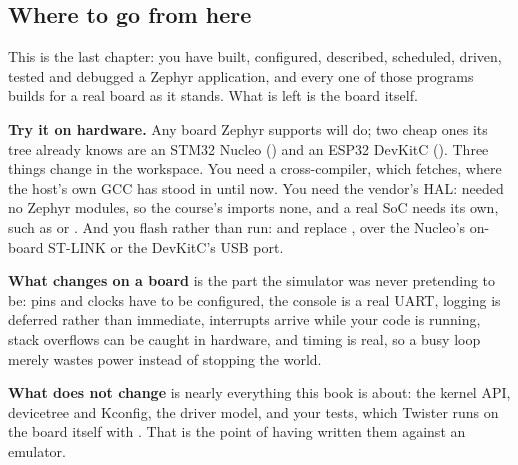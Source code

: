 \subsection*{Where to go from here}
This is the last chapter: you have built, configured, described, scheduled, driven, tested and
debugged a Zephyr application, and every one of those programs builds for a real board as it stands.
What is left is the board itself.

\textbf{Try it on hardware.} Any board Zephyr supports will do; two cheap ones its tree already
knows are an STM32 Nucleo () and an ESP32 DevKitC
(). Three things change in the workspace. You need a
cross-compiler, which  fetches, where the host's own GCC has stood in until
now. You need the vendor's HAL:  needed no Zephyr modules, so the course's
 imports none, and a real SoC needs its own, such as  or
. And you flash rather than run:  and 
replace , over the Nucleo's on-board ST-LINK or the DevKitC's USB port.

\textbf{What changes on a board} is the part the simulator was never pretending to be: pins and
clocks have to be configured, the console is a real UART, logging is deferred rather than immediate,
interrupts arrive while your code is running, stack overflows can be caught in hardware, and timing
is real, so a busy loop merely wastes power instead of stopping the world.

\textbf{What does not change} is nearly everything this book is about: the kernel API, devicetree
and Kconfig, the driver model, and your tests, which Twister runs on the board itself with
. That is the point of having written them against an emulator.
